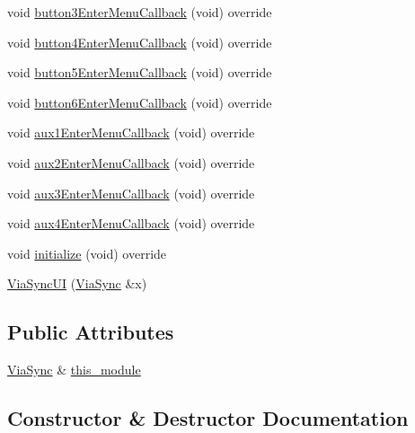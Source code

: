 \begin{DoxyCompactItemize}
\item 
void \mbox{\hyperlink{class_via_sync_1_1_via_sync_u_i_a695a9d89eaf1b1e03bba057e4f89b3c2}{button3\+Enter\+Menu\+Callback}} (void) override
\item 
void \mbox{\hyperlink{class_via_sync_1_1_via_sync_u_i_a01e30440d48527321570f93d67e93aa5}{button4\+Enter\+Menu\+Callback}} (void) override
\item 
void \mbox{\hyperlink{class_via_sync_1_1_via_sync_u_i_ad02cd6e9495afcd256a3b3475809bf5b}{button5\+Enter\+Menu\+Callback}} (void) override
\item 
void \mbox{\hyperlink{class_via_sync_1_1_via_sync_u_i_a114ee3916efcf43b16f6265151350e15}{button6\+Enter\+Menu\+Callback}} (void) override
\item 
void \mbox{\hyperlink{class_via_sync_1_1_via_sync_u_i_a9e9fd5bc4d9d9cfe255a8cf099ba5110}{aux1\+Enter\+Menu\+Callback}} (void) override
\item 
void \mbox{\hyperlink{class_via_sync_1_1_via_sync_u_i_a8af905460e4d9b91420fa557be0baeae}{aux2\+Enter\+Menu\+Callback}} (void) override
\item 
void \mbox{\hyperlink{class_via_sync_1_1_via_sync_u_i_a66f7a9ccbfff3b1b1ba32fe775808703}{aux3\+Enter\+Menu\+Callback}} (void) override
\item 
void \mbox{\hyperlink{class_via_sync_1_1_via_sync_u_i_ab74dfab193404bd23e90ba1b44a0a743}{aux4\+Enter\+Menu\+Callback}} (void) override
\item 
void \mbox{\hyperlink{class_via_sync_1_1_via_sync_u_i_a0d9dbe5a0b663acc88b45b46f440db78}{initialize}} (void) override
\item 
\mbox{\hyperlink{class_via_sync_1_1_via_sync_u_i_a1bd90ed57d017480e16b7727f0b4ec65}{Via\+Sync\+UI}} (\mbox{\hyperlink{class_via_sync}{Via\+Sync}} \&x)
\end{DoxyCompactItemize}
\subsection*{Public Attributes}
\begin{DoxyCompactItemize}
\item 
\mbox{\hyperlink{class_via_sync}{Via\+Sync}} \& \mbox{\hyperlink{class_via_sync_1_1_via_sync_u_i_a15989db3913bb8fb9abf9961d1125e63}{this\+\_\+module}}
\end{DoxyCompactItemize}


\subsection{Constructor \& Destructor Documentation}
\mbox{\label{class_via_sync_1_1_via_sync_u_i_a1bd90ed57d017480e16b7727f0b4ec65}} 
